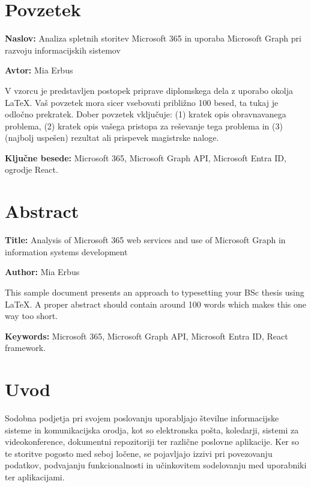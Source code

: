 \documentclass[a4paper, 12pt]{book}
\newcommand{\ttitle}{Analiza spletnih storitev Microsoft 365 in uporaba Microsoft Graph pri razvoju informacijskih sistemov}
\newcommand{\ttitleEn}{Analysis of Microsoft 365 web services and use of Microsoft Graph in information systems development}
\newcommand{\tauthor}{Mia Erbus}
\newcommand{\tkeywords}{Microsoft 365, Microsoft Graph API, Microsoft Entra ID, ogrodje React}
\newcommand{\tkeywordsEn}{Microsoft 365, Microsoft Graph API, Microsoft Entra ID, React framework}
\newcommand{\clearemptydoublepage}{\newpage{\pagestyle{empty}\cleardoublepage}}
\begin{document}
\clearemptydoublepage

\chapter*{Povzetek}

\noindent\textbf{Naslov:} \ttitle
\bigskip

\noindent\textbf{Avtor:} \tauthor
\bigskip

\noindent V vzorcu je predstavljen postopek priprave diplomskega dela z uporabo okolja \LaTeX. Vaš povzetek mora sicer vsebovati približno 100 besed, ta tukaj je odločno prekratek.
Dober povzetek vključuje: (1) kratek opis obravnavanega problema, (2) kratek opis vašega pristopa za reševanje tega problema in (3) (najbolj uspešen) rezultat ali prispevek magistrske naloge.

\bigskip

\noindent\textbf{Ključne besede:} \tkeywords.
\clearemptydoublepage

\chapter*{Abstract}

\noindent\textbf{Title:} \ttitleEn
\bigskip

\noindent\textbf{Author:} \tauthor
\bigskip

\noindent This sample document presents an approach to typesetting your BSc thesis using \LaTeX. 
A proper abstract should contain around 100 words which makes this one way too short.
\bigskip

\noindent\textbf{Keywords:} \tkeywordsEn.
\clearemptydoublepage

\mainmatter
\setcounter{page}{1}
\pagestyle{fancy}

\chapter{Uvod}
Sodobna podjetja pri svojem poslovanju uporabljajo številne informacijske sisteme in komunikacijska orodja, kot so elektronska pošta, koledarji, sistemi za videokonference, dokumentni repozitoriji ter različne poslovne aplikacije.
Ker so te storitve pogosto med seboj ločene, se pojavljajo izzivi pri povezovanju podatkov, podvajanju funkcionalnosti in učinkovitem sodelovanju med uporabniki ter aplikacijami.
\end{document}
